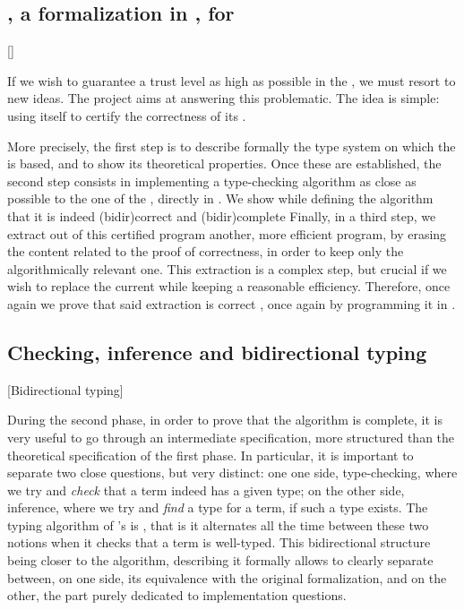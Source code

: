 \subsection{, a formalization in , for }[]

If we wish to guarantee a trust level as high as possible in the , we must
resort to new ideas. The  project aims at answering this problematic. The idea
is simple: using  itself to certify the correctness of its .

More precisely, the first step is to describe formally the type system on which the 
is based, and to show its theoretical properties.
Once these are established, the second step
consists in implementing a type-checking algorithm as close as possible to the one of the
, directly in %
.
We show while defining the algorithm that it is indeed \reintro(bidir){correct}%
and \reintro(bidir){complete}%
Finally, in a third step, we extract out of this certified  program another,
more efficient program, by erasing the content related to the proof of correctness, in order
to keep only the algorithmically relevant one.
This extraction is a complex step, but crucial if we wish to replace the current 
while keeping a reasonable efficiency. Therefore, once again we prove that said extraction
is correct%
,
once again by programming it in .

\subsection{Checking, inference and bidirectional typing}[Bidirectional typing]

During the second phase, in order to prove that the algorithm is complete, it is
very useful to go through an intermediate specification, more structured than the
theoretical specification of the first phase.
In particular, it is important to separate two close questions, but very distinct:
one one side, type-checking, where we try and \emph{check} that a term indeed has a
given type;
on the other side, inference, where we try and \emph{find} a type for a term, if such a
type exists.
The typing algorithm of 's  is , that is it
alternates all the time between these two notions when it checks that a term is well-typed.
This bidirectional structure being closer to the algorithm, describing it formally allows to
clearly separate between, on one side, its equivalence with the original formalization, and
on the other, the part purely dedicated to implementation questions.

